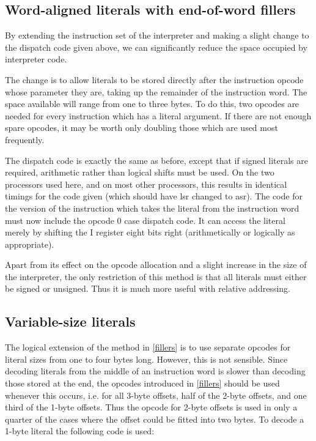 \documentclass{article}
\begin{document}
\subsection{Word-aligned literals with end-of-word fillers\label{fillers}}

By extending the instruction set of the interpreter and making a slight change
to the dispatch code given above, we can significantly reduce the space occupied
by interpreter code.

The change is to allow literals to be stored directly after the instruction opcode
whose parameter they are, taking up the remainder of the instruction word. The
space available will range from one to three bytes. To do this, two opcodes are
needed for every instruction which has a literal argument. If there are not enough
spare opcodes, it may be worth only doubling those which are used most frequently.

The dispatch code is exactly the same as before, except that if signed literals
are required, arithmetic rather than logical shifts must be used. On the two processors
used here, and on most other processors, this results in identical timings for
the code given (which should have lsr changed to asr). The code for the version
of the instruction which takes the literal from the instruction word must now
include the opcode 0 case dispatch code. It can access the literal merely by shifting
the I register eight bits right (arithmetically or logically as appropriate).

Apart from its effect on the opcode allocation and a slight increase in the size
of the interpreter, the only restriction of this method is that all literals must
either be signed or unsigned. Thus it is much more useful with relative addressing.


\subsection{Variable-size literals\label{variable}}

The logical extension of the method in \ref{fillers} is to use separate opcodes
for literal sizes from one to four bytes long. However, this is not sensible.
Since decoding literals from the middle of an instruction word is slower than
decoding those stored at the end, the opcodes introduced in \ref{fillers} should
be used whenever this occurs, i.e. for all 3-byte offsets, half of the 2-byte
offsets, and one third of the 1-byte offsets. Thus the opcode for 2-byte offsets
is used in only a quarter of the cases where the offset could be fitted into two
bytes. To decode a 1-byte literal the following code is used:
\end{document}
